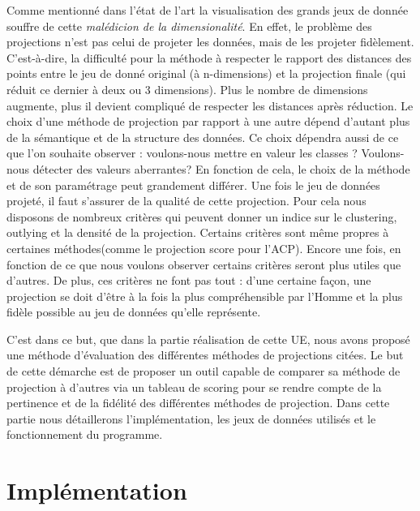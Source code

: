 Comme mentionné dans l’état de l’art la visualisation des grands jeux de donnée souffre de cette \textit{malédicion de la dimensionalité}. En effet, le problème des projections n’est pas celui de projeter les données, mais de les projeter fidèlement. 
C’est-à-dire, la difficulté pour la méthode à respecter le rapport des distances des points entre le jeu de donné original (à n-dimensions) et la projection finale (qui réduit ce dernier à deux ou 3 dimensions). 
Plus le nombre de dimensions augmente, plus il devient compliqué de respecter les distances après réduction. 
\newline
Le choix d’une méthode de projection par rapport à une autre dépend d'autant plus de la sémantique et de la structure des données. Ce choix dépendra aussi de ce que l’on souhaite observer : voulons-nous mettre en valeur les classes ? Voulons-nous détecter des valeurs aberrantes? 
En fonction de cela, le choix de la méthode et de son paramétrage peut grandement différer.
\smallskip
Une fois le jeu de données projeté, il faut s’assurer de la qualité de cette projection.
Pour cela nous disposons de nombreux critères qui peuvent donner un indice sur le clustering, outlying et la densité de la projection. Certains critères sont même propres à certaines méthodes(comme le projection score pour l'ACP).
Encore une fois, en fonction de ce que nous voulons observer certains critères seront plus utiles que d'autres. De plus, ces critères ne font pas tout : d’une certaine façon, une projection se doit d’être à la fois la plus compréhensible par l’Homme et la plus fidèle possible au jeu de données qu’elle représente.


\medskip
C'est dans ce but, que dans la partie réalisation de cette UE, nous avons proposé une méthode d'évaluation des différentes méthodes de projections citées.
Le but de cette démarche est de proposer un outil capable de comparer sa méthode de projection à d'autres via un tableau de scoring pour se rendre compte de la pertinence et de la fidélité des différentes méthodes de projection.
Dans cette partie nous détaillerons l'implémentation, les jeux de données utilisés et le fonctionnement du programme.
\medskip


\section{Implémentation}


